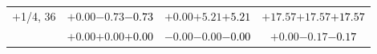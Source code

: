 \documentclass[compress]{beamer}
\begin{document}
\begin{frame}
\begin{tabular}{r | c | c | c}
$+$1/4, 36 & $+0.00$\hspace{0.1 cm}$-0.73$\hspace{0.1 cm}\textcolor{black}{$-0.73$} & $+0.00$\hspace{0.1 cm}$+5.21$\hspace{0.1 cm}\textcolor{black}{$+5.21$} & $+17.57$\hspace{0.1 cm}$+17.57$\hspace{0.1 cm}\textcolor{black}{$+17.57$} \\
           & $+0.00$\hspace{0.1 cm}$+0.00$\hspace{0.1 cm}\textcolor{black}{$+0.00$} & $-0.00$\hspace{0.1 cm}$-0.00$\hspace{0.1 cm}\textcolor{black}{$-0.00$} & $+0.00$\hspace{0.1 cm}$-0.17$\hspace{0.1 cm}\textcolor{black}{$-0.17$} \\
\end{tabular}
\end{frame}
\end{document}
